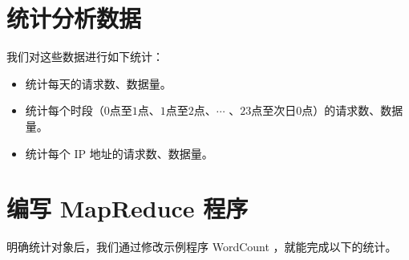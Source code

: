 \documentclass{article}
\begin{document}
\section{统计分析数据}

我们对这些数据进行如下统计：

\begin{itemize}
\item 统计每天的请求数、数据量。
\item 统计每个时段（$0$点至$1$点、$1$点至$2$点、$\cdots$ 、$23$点至次日$0$点）的请求数、数据量。
\item 统计每个 IP 地址的请求数、数据量。
\end{itemize}

\section{编写 MapReduce 程序}

明确统计对象后，我们通过修改示例程序 WordCount ，就能完成以下的统计。
\end{document}
